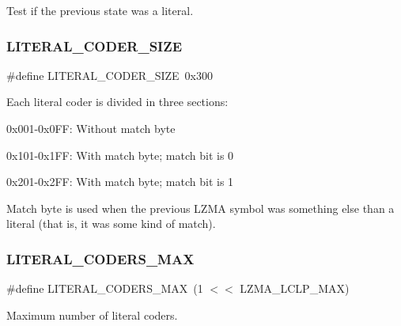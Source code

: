 Test if the previous state was a literal. 

\mbox{\label{lzma__common_8h_a10b5f469b05969cb31c55a66e0de8803}} 
\subsubsection{L\+I\+T\+E\+R\+A\+L\+\_\+\+C\+O\+D\+E\+R\+\_\+\+S\+I\+ZE}
{\footnotesize\ttfamily \#define L\+I\+T\+E\+R\+A\+L\+\_\+\+C\+O\+D\+E\+R\+\_\+\+S\+I\+ZE~0x300}

Each literal coder is divided in three sections\+:
\begin{DoxyItemize}
\item 0x001-\/0x0\+FF\+: Without match byte
\item 0x101-\/0x1\+FF\+: With match byte; match bit is 0
\item 0x201-\/0x2\+FF\+: With match byte; match bit is 1
\end{DoxyItemize}

Match byte is used when the previous L\+Z\+MA symbol was something else than a literal (that is, it was some kind of match). \mbox{\label{lzma__common_8h_aec4bc6b32a64f98d6ff9c04034a42cb9}} 
\subsubsection{L\+I\+T\+E\+R\+A\+L\+\_\+\+C\+O\+D\+E\+R\+S\+\_\+\+M\+AX}
{\footnotesize\ttfamily \#define L\+I\+T\+E\+R\+A\+L\+\_\+\+C\+O\+D\+E\+R\+S\+\_\+\+M\+AX~(1 $<$$<$ L\+Z\+M\+A\+\_\+\+L\+C\+L\+P\+\_\+\+M\+AX)}



Maximum number of literal coders. 

\mbox{\label{lzma__common_8h_a76c5317ac9a42bdc6349815648fd7707}} 
